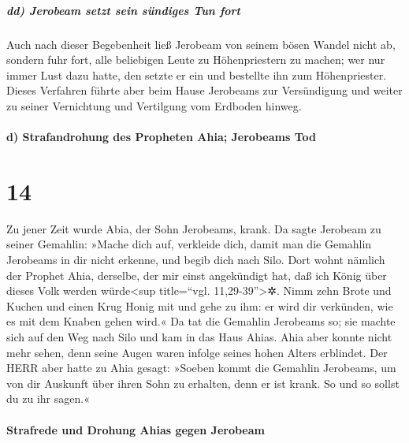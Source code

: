 \hypertarget{dd-jerobeam-setzt-sein-suxfcndiges-tun-fort}{%
\subparagraph{dd) Jerobeam setzt sein sündiges Tun
fort}\label{dd-jerobeam-setzt-sein-suxfcndiges-tun-fort}}

Auch nach dieser Begebenheit ließ Jerobeam von seinem
bösen Wandel nicht ab, sondern fuhr fort, alle beliebigen Leute zu
Höhenpriestern zu machen; wer nur immer Lust dazu hatte, den setzte er
ein und bestellte ihn zum Höhenpriester. Dieses Verfahren
führte aber beim Hause Jerobeams zur Versündigung und weiter zu seiner
Vernichtung und Vertilgung vom Erdboden hinweg.

\hypertarget{d-strafandrohung-des-propheten-ahia-jerobeams-tod}{%
\paragraph{d) Strafandrohung des Propheten Ahia; Jerobeams
Tod}\label{d-strafandrohung-des-propheten-ahia-jerobeams-tod}}

\hypertarget{section-13}{%
\section{14}\label{section-13}}

Zu jener Zeit wurde Abia, der Sohn Jerobeams, krank.
Da sagte Jerobeam zu seiner Gemahlin: »Mache dich auf,
verkleide dich, damit man die Gemahlin Jerobeams in dir nicht erkenne,
und begib dich nach Silo. Dort wohnt nämlich der Prophet Ahia, derselbe,
der mir einst angekündigt hat, daß ich König über dieses Volk werden
würde\textless sup title=``vgl. 11,29-39''\textgreater✲.
Nimm zehn Brote und Kuchen und einen Krug Honig mit und
gehe zu ihm: er wird dir verkünden, wie es mit dem Knaben gehen wird.«
Da tat die Gemahlin Jerobeams so; sie machte sich auf den
Weg nach Silo und kam in das Haus Ahias. Ahia aber konnte nicht mehr
sehen, denn seine Augen waren infolge seines hohen Alters erblindet.
Der HERR aber hatte zu Ahia gesagt: »Soeben kommt die
Gemahlin Jerobeams, um von dir Auskunft über ihren Sohn zu erhalten,
denn er ist krank. So und so sollst du zu ihr sagen.«

\hypertarget{strafrede-und-drohung-ahias-gegen-jerobeam}{%
\paragraph{Strafrede und Drohung Ahias gegen
Jerobeam}\label{strafrede-und-drohung-ahias-gegen-jerobeam}}

